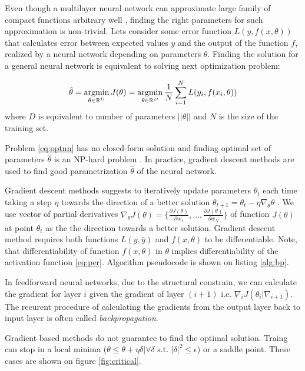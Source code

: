 Even though a multilayer neural network can approximate large family of compact functions arbitrary well \cite{Debao1993}, finding the right parameters for such approximation is non-trivial.
Lets consider some error function $L(y, f(x, \theta))$ that calculates error between expected values $y$ and the output of the function $f$, realized by a neural network depending on parameters $\theta$. Finding the solution for a general neural network is equivalent to solving next optimization problem:

\begin{equation}\label{eq:optnn}
  \hat{\theta} = \operatorname*{argmin}_{\theta \in \Bbb{R}^D} J(\theta) = \operatorname*{argmin}_{\theta \in \Bbb{R}^D} \frac{1}{N} \sum_{i=1}^{N} L(y_i, f(x_i, \theta))
\end{equation}
where $D$ is equivalent to number of parameters $||\theta||$ and $N$ is the size of the training set.

Problem \ref{eq:optnn} has no closed-form solution and finding optimal set of parameters $\hat{\theta}$ is an NP-hard problem \cite{Anandkumar16}.
In practice, gradient descent methods are used to find good parametrization $\hat{\theta}$ of the neural network.

Gradient descent methods suggests to iteratively update parameters $\theta_t$ each time taking a step $\eta$ towards the direction of a better solution $\theta_{t+1}=\theta_t - \eta \nabla_\theta \theta$ \cite{Cauchy1847}.
We use vector of partial derivatives $\nabla_\theta J(\theta)=\{ \frac{\partial J(\theta)}{\partial w_1}, \ldots, \frac{\partial J(\theta)}{\partial w_N} \}$ of function $J(\theta)$ at point $\theta_t$ as the the direction towards a better solution. Gradient descent method requires both functions $L(y, \hat{y})$ and $f(x, \theta)$ to be differentiable. Note, that differentiability of function $f(x, \theta)$ in $\theta$ implies differentiability of the activation function \ref{eq:per}. Algorithm pseudocode is shown on listing \ref{alg:bp}.



In feedforward neural networks, due to the structural constrain, we can calculate the gradient for layer $i$ given the gradient of layer $(i+1)$ i.e. $\nabla_i J(\theta_i|\nabla_{i+1})$. The recurent procedure of calculating the gradients from the output layer back to input layer is often called \textit{backpropagation}.


Gradient based methods do not guarantee to find the optimal solution.
Traing can stop in a local minima ($\theta \leq \theta + \eta \delta | \forall \delta \text{ s.t. } |\delta|^2 \leq \epsilon$) or a saddle point.
These cases are shown on figure \ref{fig:critical}.

